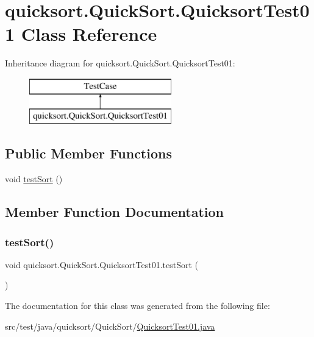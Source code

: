 \hypertarget{classquicksort_1_1_quick_sort_1_1_quicksort_test01}{}\section{quicksort.\+Quick\+Sort.\+Quicksort\+Test01 Class Reference}
\label{classquicksort_1_1_quick_sort_1_1_quicksort_test01}
Inheritance diagram for quicksort.\+Quick\+Sort.\+Quicksort\+Test01\+:\begin{figure}[H]
\begin{center}
\leavevmode
\includegraphics[height=2.000000cm]{classquicksort_1_1_quick_sort_1_1_quicksort_test01}
\end{center}
\end{figure}
\subsection*{Public Member Functions}
\begin{DoxyCompactItemize}
\item 
void \hyperlink{classquicksort_1_1_quick_sort_1_1_quicksort_test01_a38c1f058c630782d5cb190b2994b5059}{test\+Sort} ()
\end{DoxyCompactItemize}


\subsection{Member Function Documentation}
\hypertarget{classquicksort_1_1_quick_sort_1_1_quicksort_test01_a38c1f058c630782d5cb190b2994b5059}{}\label{classquicksort_1_1_quick_sort_1_1_quicksort_test01_a38c1f058c630782d5cb190b2994b5059} 
\subsubsection{\texorpdfstring{test\+Sort()}{testSort()}}
{\footnotesize\ttfamily void quicksort.\+Quick\+Sort.\+Quicksort\+Test01.\+test\+Sort (\begin{DoxyParamCaption}{ }\end{DoxyParamCaption})}



The documentation for this class was generated from the following file\+:\begin{DoxyCompactItemize}
\item 
src/test/java/quicksort/\+Quick\+Sort/\hyperlink{_quicksort_test01_8java}{Quicksort\+Test01.\+java}\end{DoxyCompactItemize}
